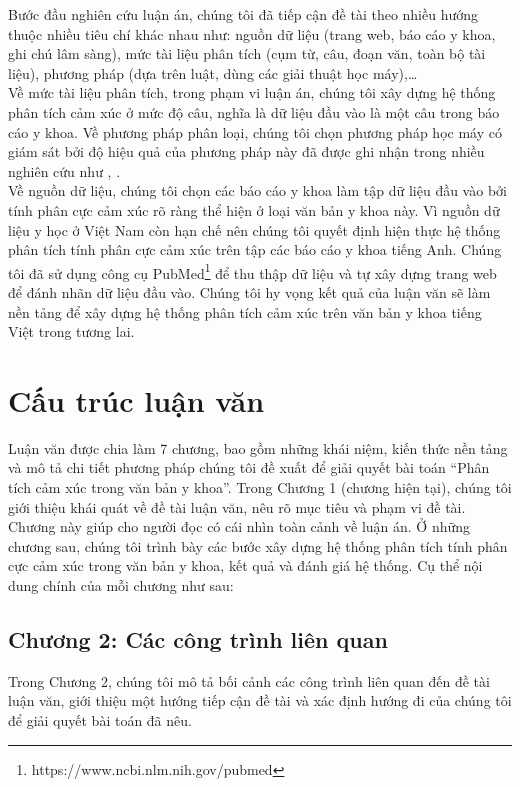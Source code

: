 Bước đầu nghiên cứu luận án, chúng tôi đã tiếp cận đề tài theo nhiều hướng thuộc nhiều tiêu chí khác nhau như: nguồn dữ liệu (trang web, báo cáo y khoa, ghi chú lâm sàng), mức tài liệu phân tích (cụm từ, câu, đoạn văn, toàn bộ tài liệu), phương pháp (dựa trên luật, dùng các giải thuật học máy),\ldots \\

Về mức tài liệu phân tích, trong phạm vi luận án, chúng tôi xây dựng hệ thống phân tích cảm xúc ở mức độ câu, nghĩa là dữ liệu đầu vào là một câu trong báo cáo y khoa. Về phương pháp phân loại, chúng tôi chọn phương pháp học máy có giám sát  bởi độ hiệu quả của phương pháp này đã được ghi nhận trong nhiều nghiên cứu như \cite{chandrakala2012opinion}, \cite{manning2009anintroduction}.\\

Về nguồn dữ liệu, chúng tôi chọn các báo cáo y khoa làm tập dữ liệu đầu vào bởi tính phân cực cảm xúc rõ ràng thể hiện ở loại văn bản y khoa này. Vì nguồn dữ liệu y học ở Việt Nam còn hạn chế nên chúng tôi quyết định hiện thực hệ thống phân tích tính phân cực cảm xúc trên tập các báo cáo y khoa tiếng Anh. Chúng tôi đã sử dụng công cụ PubMed\footnote{https://www.ncbi.nlm.nih.gov/pubmed} để thu thập dữ liệu và tự xây dựng trang web để đánh nhãn dữ liệu đầu vào. Chúng tôi hy vọng kết quả của luận văn sẽ làm nền tảng để xây dựng hệ thống phân tích cảm xúc trên văn bản y khoa tiếng Việt trong tương lai.\\
 

\section{Cấu trúc luận văn}
Luận văn được chia làm 7 chương, bao gồm những khái niệm, kiến thức nền tảng và mô tả chi tiết phương pháp chúng tôi đề xuất để giải quyết bài toán ``Phân tích cảm xúc trong văn bản y khoa''. Trong Chương 1 (chương hiện tại), chúng tôi giới thiệu khái quát về đề tài luận văn, nêu rõ mục tiêu và phạm vi đề tài. Chương này giúp cho người đọc có cái nhìn toàn cảnh về luận án. Ở những chương sau, chúng tôi trình bày các bước xây dựng hệ thống phân tích tính phân cực cảm xúc trong văn bản y khoa, kết quả và đánh giá hệ thống. Cụ thể nội dung chính của mỗi chương như sau:

\subsection*{Chương 2: Các công trình liên quan}
Trong Chương 2, chúng tôi mô tả bối cảnh các công trình liên quan đến đề tài luận văn, giới thiệu một hướng tiếp cận đề tài và xác định hướng đi của chúng tôi để giải quyết bài toán đã nêu.
